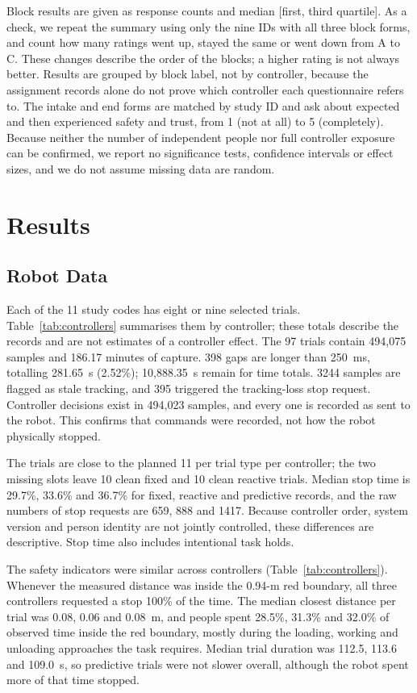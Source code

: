 \documentclass{IEEEtran}
\begin{document}
Block results are given as response counts and median [first, third
quartile]. As a check, we repeat the summary using only the nine IDs with all
three block forms, and count how many ratings went up, stayed the same or went
down from A to C. These changes describe the order of the blocks; a higher
rating is not always better. Results are grouped by block label, not by
controller, because the assignment records alone do not prove which controller
each questionnaire refers to. The intake and end forms are matched by study ID
and ask about expected and then experienced safety and trust, from 1 (not at
all) to 5 (completely). Because neither the number of independent people nor
full controller exposure can be confirmed, we report no significance tests,
confidence intervals or effect sizes, and we do not assume missing data are
random.

\section{Results}
\subsection{Robot Data}
Each of the 11 study codes has eight or nine selected trials.
Table~\ref{tab:controllers} summarises them by controller; these totals
describe the records and are not estimates of a controller effect. The 97
trials contain 494,075 samples and 186.17 minutes of capture. 398 gaps are
longer than 250~ms, totalling 281.65~s (2.52\%); 10,888.35~s remain for time
totals. 3244 samples are flagged as stale tracking, and 395 triggered the
tracking-loss stop request. Controller decisions exist in 494,023 samples,
and every one is recorded as sent to the robot. This confirms that commands
were recorded, not how the robot physically stopped.

The trials are close to the planned 11 per trial type per controller; the two
missing slots leave 10 clean fixed and 10 clean reactive trials. Median stop
time is 29.7\%, 33.6\% and 36.7\% for fixed, reactive and predictive records,
and the raw numbers of stop requests are 659, 888 and 1417. Because
controller order, system version and person identity are not jointly
controlled, these differences are descriptive. Stop time also includes
intentional task holds.

The safety indicators were similar across controllers
(Table~\ref{tab:controllers}). Whenever the measured distance was inside the
0.94-m red boundary, all three controllers requested a stop 100\% of the time.
The median closest distance per trial was 0.08, 0.06 and 0.08~m, and people
spent 28.5\%, 31.3\% and 32.0\% of observed time inside the red boundary,
mostly during the loading, working and unloading approaches the task requires.
Median trial duration was 112.5, 113.6 and 109.0~s, so predictive trials were
not slower overall, although the robot spent more of that time stopped.
\end{document}
